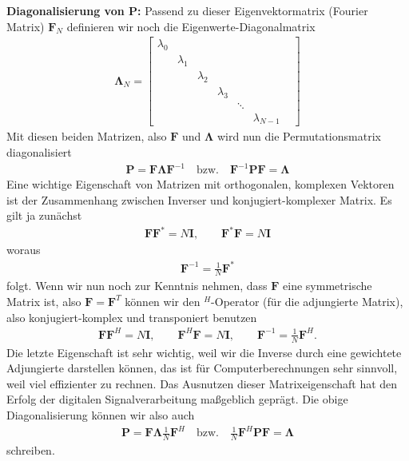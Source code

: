 \textbf{Diagonalisierung von $\bm{P}$:}
Passend zu dieser Eigenvektormatrix (Fourier Matrix)
$\bm{F}_N$ definieren wir noch die Eigenwerte-Diagonalmatrix
\begin{align}
\bm{\Lambda}_N =
\begin{bmatrix}
\lambda_0 & & & & &\\
&\lambda_1 & & & & \\
&&\lambda_2 & & & \\
&&&\lambda_3 & & \\
&&&& \ddots& & \\
&&&&&\lambda_{N-1}
\end{bmatrix}
\end{align}
Mit diesen beiden Matrizen, also $\bm{F}$ und $\bm{\Lambda}$ wird nun die
Permutationsmatrix diagonalisiert
\begin{align}
\bm{P}  = \bm{F} \bm{\Lambda} \bm{F}^{-1} \quad\text{bzw.}\quad
\bm{F}^{-1} \bm{P} \bm{F} = \bm{\Lambda}
\end{align}
Eine wichtige Eigenschaft von Matrizen mit orthogonalen, komplexen Vektoren
ist der Zusammenhang zwischen Inverser und konjugiert-komplexer Matrix.
Es gilt ja zunächst
\begin{align}
\bm{F}\bm{F}^* = N \bm{I}, \qquad \bm{F}^*\bm{F} = N \bm{I}
\end{align}
woraus
\begin{align}
\bm{F}^{-1} = \frac{1}{N} \bm{F}^*
\end{align}
folgt.
Wenn wir nun noch zur Kenntnis nehmen, dass $\bm{F}$ eine symmetrische Matrix ist,
also $\bm{F}=\bm{F}^T$ können wir den $^H$-Operator (für die adjungierte
Matrix), also konjugiert-komplex und transponiert benutzen
\begin{align}
\bm{F}\bm{F}^H = N \bm{I},\qquad
\bm{F}^H\bm{F} = N \bm{I},\qquad
\bm{F}^{-1} = \frac{1}{N} \bm{F}^H.
\end{align}
Die letzte Eigenschaft ist sehr wichtig, weil wir die Inverse durch eine
gewichtete Adjungierte darstellen können, das ist für Computerberechnungen
sehr sinnvoll, weil viel effizienter zu rechnen. Das Ausnutzen dieser
Matrixeigenschaft hat den Erfolg der digitalen
Signalverarbeitung maßgeblich geprägt.
%
Die obige Diagonalisierung können wir also auch
\begin{align}
\bm{P}  = \bm{F} \bm{\Lambda} \frac{1}{N} \bm{F}^H \quad\text{bzw.}\quad
\frac{1}{N} \bm{F}^H \bm{P} \bm{F} = \bm{\Lambda}
\end{align}
schreiben.

